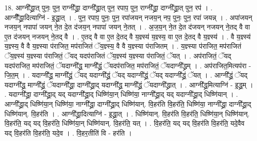 \documentclass[17pt]{extarticle}
\begin{document}
18. आग्नी᳚द्ध्रा॒त् पुनः॒ पुन॒ राग्नी᳚द्ध्रा॒ दाग्नी᳚द्ध्रा॒त् पुन॒ रपाप॒ पुन॒ राग्नी᳚द्ध्रा॒ दाग्नी᳚द्ध्रा॒त् पुन॒ रप॑ । . आग्नी᳚᳚द्ध्रा॒दित्याग्नि॑ - इ॒द्ध्रा॒त् । . पुन॒ रपाप॒ पुनः॒ पुन॒ रपा॑जयन् नजय॒न् नप॒ पुनः॒ पुन॒ रपा॑ जयन्न् । . अपा॑जयन् नजय॒न् नपापा॑ जयन् ने॒त दे॒त द॑जय॒न् नपापा॑ जयन् ने॒तत् । . अ॒ज॒य॒न् ने॒त दे॒त द॑जयन् नजयन् ने॒तद् वै वा ए॒त द॑जयन् नजयन् ने॒तद् वै । . ए॒तद् वै वा ए॒त दे॒तद् वै य॒ज्ञ्स्य॑ य॒ज्ञ्स्य॒ वा ए॒त दे॒तद् वै य॒ज्ञ्स्य॑ । . वै य॒ज्ञ्स्य॑ य॒ज्ञ्स्य॒ वै वै य॒ज्ञ्स्या प॑राजित॒ मप॑राजितं ॅय॒ज्ञ्स्य॒ वै वै य॒ज्ञ्स्या प॑राजितम् । . य॒ज्ञ्स्या प॑राजित॒ मप॑राजितं ॅय॒ज्ञ्स्य॑ य॒ज्ञ्स्या प॑राजितं॒ ॅयद् यदप॑राजितं ॅय॒ज्ञ्स्य॑ य॒ज्ञ्स्या प॑राजितं॒ ॅयत् । . अप॑राजितं॒ ॅयद् यदप॑राजित॒ मप॑राजितं॒ ॅयदाग्नी᳚द्ध्र॒ माग्नी᳚द्ध्रं॒ ॅयदप॑राजित॒ मप॑राजितं॒ ॅयदाग्नी᳚द्ध्रम् । . अप॑राजित॒मित्यप॑रा - जि॒त॒म् । . यदाग्नी᳚द्ध्र॒ माग्नी᳚द्ध्रं॒ ॅयद् यदाग्नी᳚द्ध्रं॒ ॅयद् यदाग्नी᳚द्ध्रं॒ ॅयद् यदाग्नी᳚द्ध्रं॒ ॅयत् । . आग्नी᳚द्ध्रं॒ ॅयद् यदाग्नी᳚द्ध्र॒ माग्नी᳚द्ध्रं॒ ॅयदाग्नी᳚द्ध्रा॒ दाग्नी᳚द्ध्रा॒द् यदाग्नी᳚द्ध्र॒ माग्नी᳚द्ध्रं॒ ॅयदाग्नी᳚द्ध्रात् । . आग्नी᳚द्ध्र॒मित्याग्नि॑ - इ॒द्ध्र॒म् । . यदाग्नी᳚द्ध्रा॒ दाग्नी᳚द्ध्रा॒द् यद् यदाग्नी᳚द्ध्रा॒द् धिष्णि॑या॒न् धिष्णि॑या॒ नाग्नी᳚द्ध्रा॒द् यद् यदाग्नी᳚द्ध्रा॒द् धिष्णि॑यान् । . आग्नी᳚द्ध्रा॒द् धिष्णि॑या॒न् धिष्णि॑या॒ नाग्नी᳚द्ध्रा॒ दाग्नी᳚द्ध्रा॒द् धिष्णि॑यान्. वि॒हर॑ति वि॒हर॑ति॒ धिष्णि॑या॒ नाग्नी᳚द्ध्रा॒ दाग्नी᳚द्ध्रा॒द् धिष्णि॑यान्. वि॒हर॑ति । . आग्नी᳚द्ध्रा॒दित्याग्नि॑ - इ॒द्ध्रा॒त् । . धिष्णि॑यान्. वि॒हर॑ति वि॒हर॑ति॒ धिष्णि॑या॒न् धिष्णि॑यान्. वि॒हर॑ति॒ यद् यद् वि॒हर॑ति॒ धिष्णि॑या॒न् धिष्णि॑यान्. वि॒हर॑ति॒ यत् । . वि॒हर॑ति॒ यद् यद् वि॒हर॑ति वि॒हर॑ति॒ यदे॒वैव यद् वि॒हर॑ति वि॒हर॑ति॒ यदे॒व । . वि॒हर॒तीति॑ वि - हर॑ति । \newline
\end{document}
